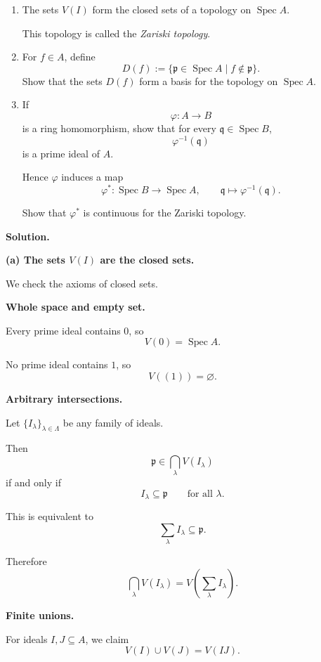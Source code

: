 \documentclass[12pt,a4paper]{article}
\DeclareMathOperator{\Spec}{Spec}
\theoremstyle{plain}
\theoremstyle{definition}      %
\begin{document}
	\begin{enumerate}
		\item[(a)]
		The sets \(V(I)\) form the closed sets of a topology on \(\Spec A\).
		
		This topology is called the \emph{Zariski topology}.
		
		\item[(b)]
		For \(f\in A\), define
		\[
		D(f)
		:=
		\{\mathfrak p\in \Spec A \mid f\notin \mathfrak p\}.
		\]
		Show that the sets \(D(f)\) form a basis for the topology on \(\Spec A\).
		
		\item[(c)]
		If
		\[
		\varphi:A\longrightarrow B
		\]
		is a ring homomorphism, show that for every \(\mathfrak q\in \Spec B\),
		\[
		\varphi^{-1}(\mathfrak q)
		\]
		is a prime ideal of \(A\).
		
		Hence \(\varphi\) induces a map
		\[
		\varphi^*:\Spec B\longrightarrow \Spec A,
		\qquad
		\mathfrak q\longmapsto \varphi^{-1}(\mathfrak q).
		\]
		
		Show that \(\varphi^*\) is continuous for the Zariski topology.
	\end{enumerate}
	
	\bigskip
	\textbf{Solution.}
	
	\textbf{(a) The sets \(V(I)\) are the closed sets.}
	
	We check the axioms of closed sets.
	
	\medskip
	\textbf{Whole space and empty set.}
	
	Every prime ideal contains \(0\), so
	\[
	V(0)=\Spec A.
	\]
	
	No prime ideal contains \(1\), so
	\[
	V((1))=\varnothing.
	\]
	
	\medskip
	\textbf{Arbitrary intersections.}
	
	Let \(\{I_\lambda\}_{\lambda\in\Lambda}\) be any family of ideals.
	
	Then
	\[
	\mathfrak p\in \bigcap_{\lambda}V(I_\lambda)
	\]
	if and only if
	\[
	I_\lambda\subseteq \mathfrak p
	\qquad\text{for all }\lambda.
	\]
	
	This is equivalent to
	\[
	\sum_{\lambda} I_\lambda \subseteq \mathfrak p.
	\]
	
	Therefore
	\[
	\bigcap_{\lambda}V(I_\lambda)
	=
	V\!\left(\sum_{\lambda} I_\lambda\right).
	\]
	
	\medskip
	\textbf{Finite unions.}
	
	For ideals \(I,J\subseteq A\), we claim
	\[
	V(I)\cup V(J)=V(IJ).
	\]
	
\end{document}
